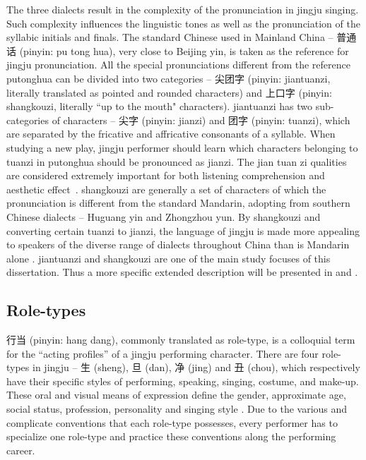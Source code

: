 The three dialects result in the complexity of the pronunciation in jingju singing. Such complexity influences the linguistic tones as well as the pronunciation of the syllabic initials and finals. The standard Chinese used in Mainland China -- 普通话 (pinyin: pu tong hua), very close to Beijing yin, is taken as the reference for jingju pronunciation. All the special pronunciations different from the reference putonghua can be divided into two categories -- 尖团字 (pinyin: \gls{jiantuanzi}, literally translated as pointed and rounded characters) and 上口字 (pinyin: \gls{shangkouzi}, literally ``up to the mouth" characters). \Gls{jiantuanzi} has two sub-categories of characters -- 尖字 (pinyin: \gls{jianzi}) and 团字 (pinyin: \gls{tuanzi}), which are separated by the fricative and affricative consonants of a syllable. When studying a new play, jingju performer should learn which characters belonging to \gls{tuanzi} in putonghua should be pronounced as \gls{jianzi}. The jian tuan zi qualities are considered extremely important for both listening comprehension and aesthetic effect \cite{Repetto2018}. \Gls{shangkouzi} are generally a set of characters of which the pronunciation is different from the standard Mandarin, adopting from southern Chinese dialects -- Huguang yin and Zhongzhou yun. By \gls{shangkouzi} and converting certain \gls{tuanzi} to \gls{jianzi}, the language of jingju is made more appealing to speakers of the diverse range of dialects throughout China than is Mandarin alone \cite{Wichmann1991a}. \Gls{jiantuanzi} and \gls{shangkouzi} are one of the main study focuses of this dissertation. Thus a more specific extended description will be presented in  and . 

\subsection{Role-types}

行当 (pinyin: hang dang), commonly translated as role-type, is a colloquial term for the “acting profiles” of a jingju performing character. There are four role-types in jingju -- 生 (\gls{sheng}), 旦 (\gls{dan}), 净 (jing) and 丑 (chou), which respectively have their specific styles of performing, speaking, singing, costume, and make-up. These oral and visual means of expression define the gender, approximate age, social status, profession, personality and singing style \cite{Yung1989a}. Due to the various and complicate conventions that each role-type possesses, every performer has to specialize one role-type and practice these conventions along the performing career. 


